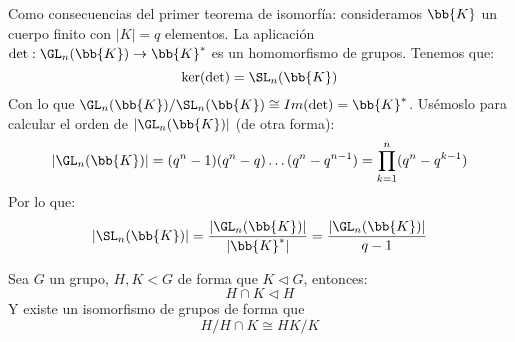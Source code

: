\begin{ejemplo}
    Como consecuencias del primer teorema de isomorfía: consideramos $\bb{K}$ un cuerpo finito con $|K| = q$ elementos. La aplicación $\det:\GL_n(\bb{K})\to \bb{K}^\ast$ es un homomorfismo de grupos. Tenemos que:
    \begin{equation*}
        \ker(\det) = \SL_n(\bb{K})
    \end{equation*}
    Con lo que $\GL_n(\bb{K})/\SL_n(\bb{K}) \cong Im(\det) = \bb{K}^\ast$. Usémoslo para calcular el orden de $|\GL_n(\bb{K})|$ (de otra forma):
    \begin{equation*}
        |\GL_n(\bb{K})| = (q^n-1)(q^n-q) \ldots (q^n-q^{n-1}) = \prod_{k=1}^{n} (q^n - q^{k-1})
    \end{equation*}
    Por lo que:
    \begin{equation*}
        |\SL_n(\bb{K})| = \dfrac{|\GL_n(\bb{K})|}{|\bb{K}^\ast|} = \dfrac{|\GL_n(\bb{K})|}{q-1}
    \end{equation*}
\end{ejemplo}

\begin{teo}
    Sea $G$ un grupo, $H,K<G$ de forma que $K\lhd G$, entonces:
    \begin{equation*}
        H\cap K \lhd H
    \end{equation*}
    Y existe un isomorfismo de grupos de forma que
    \begin{equation*}
        H/H\cap K \cong HK/K
    \end{equation*}
\end{teo}

\begin{figure}[H]
    \centering
\end{figure}

